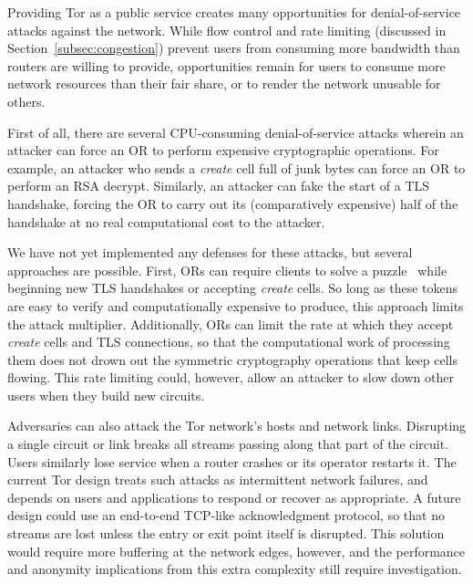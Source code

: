 \documentclass[times,10pt,twocolumn]{article}
\begin{document}
\label{sec:other-design}

\label{subsec:dos}

Providing Tor as a public service creates many opportunities for
denial-of-service attacks against the network.  While
flow control and rate limiting (discussed in
Section~\ref{subsec:congestion}) prevent users from consuming more
bandwidth than routers are willing to provide, opportunities remain for
users to
consume more network resources than their fair share, or to render the
network unusable for others.

First of all, there are several CPU-consuming denial-of-service
attacks wherein an attacker can force an OR to perform expensive
cryptographic operations.  For example, an attacker who sends a
\emph{create} cell full of junk bytes can force an OR to perform an RSA
decrypt.  Similarly, an attacker can
fake the start of a TLS handshake, forcing the OR to carry out its
(comparatively expensive) half of the handshake at no real computational
cost to the attacker.

We have not yet implemented any defenses for these attacks, but several
approaches are possible. First, ORs can
require clients to solve a puzzle~\cite{puzzles-tls} while beginning new
TLS handshakes or accepting \emph{create} cells.  So long as these
tokens are easy to verify and computationally expensive to produce, this
approach limits the attack multiplier.  Additionally, ORs can limit
the rate at which they accept \emph{create} cells and TLS connections,
so that
the computational work of processing them does not drown out the
symmetric cryptography operations that keep cells
flowing.  This rate limiting could, however, allow an attacker
to slow down other users when they build new circuits.


Adversaries can also attack the Tor network's hosts and network
links. Disrupting a single circuit or link breaks all streams passing
along that part of the circuit. Users similarly lose service
when a router crashes or its operator restarts it. The current
Tor design treats such attacks as intermittent network failures, and
depends on users and applications to respond or recover as appropriate. A
future design could use an end-to-end TCP-like acknowledgment protocol,
so that no streams are lost unless the entry or exit point itself is
disrupted. This solution would require more buffering at the network
edges, however, and the performance and anonymity implications from this
extra complexity still require investigation.
\end{document}
